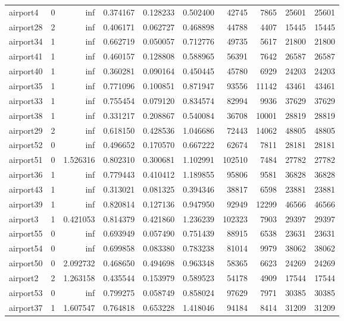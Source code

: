 \begin{longtable}{|l|r|r|r|r|r|r|r|r|r|}
airport4 & 0 & inf & 0.374167 & 0.128233 & 0.502400 & 42745 & 7865 & 25601 & 25601 \\
airport28 & 2 & inf & 0.406171 & 0.062727 & 0.468898 & 44788 & 4407 & 15445 & 15445 \\
airport34 & 1 & inf & 0.662719 & 0.050057 & 0.712776 & 49735 & 5617 & 21800 & 21800 \\
airport41 & 1 & inf & 0.460157 & 0.128808 & 0.588965 & 56391 & 7642 & 26587 & 26587 \\
airport40 & 1 & inf & 0.360281 & 0.090164 & 0.450445 & 45780 & 6929 & 24203 & 24203 \\
airport35 & 1 & inf & 0.771096 & 0.100851 & 0.871947 & 93556 & 11142 & 43461 & 43461 \\
airport33 & 1 & inf & 0.755454 & 0.079120 & 0.834574 & 82994 & 9936 & 37629 & 37629 \\
airport38 & 1 & inf & 0.331217 & 0.208867 & 0.540084 & 36708 & 10001 & 28819 & 28819 \\
airport29 & 2 & inf & 0.618150 & 0.428536 & 1.046686 & 72443 & 14062 & 48805 & 48805 \\
airport52 & 0 & inf & 0.496652 & 0.170570 & 0.667222 & 62674 & 7811 & 28181 & 28181 \\
airport51 & 0 & 1.526316 & 0.802310 & 0.300681 & 1.102991 & 102510 & 7484 & 27782 & 27782 \\
airport36 & 1 & inf & 0.779443 & 0.410412 & 1.189855 & 95806 & 9581 & 36828 & 36828 \\
airport43 & 1 & inf & 0.313021 & 0.081325 & 0.394346 & 38817 & 6598 & 23881 & 23881 \\
airport39 & 1 & inf & 0.820814 & 0.127136 & 0.947950 & 92949 & 12299 & 46566 & 46566 \\
airport3 & 1 & 0.421053 & 0.814379 & 0.421860 & 1.236239 & 102323 & 7903 & 29397 & 29397 \\
airport55 & 0 & inf & 0.693949 & 0.057490 & 0.751439 & 88915 & 6538 & 23631 & 23631 \\
airport54 & 0 & inf & 0.699858 & 0.083380 & 0.783238 & 81014 & 9979 & 38062 & 38062 \\
airport50 & 0 & 2.092732 & 0.468650 & 0.494698 & 0.963348 & 58365 & 6623 & 24269 & 24269 \\
airport2 & 2 & 1.263158 & 0.435544 & 0.153979 & 0.589523 & 54178 & 4909 & 17544 & 17544 \\
airport53 & 0 & inf & 0.799275 & 0.058749 & 0.858024 & 97629 & 7971 & 30385 & 30385 \\
airport37 & 1 & 1.607547 & 0.764818 & 0.653228 & 1.418046 & 94184 & 8414 & 31209 & 31209 \\

\end{longtable}
